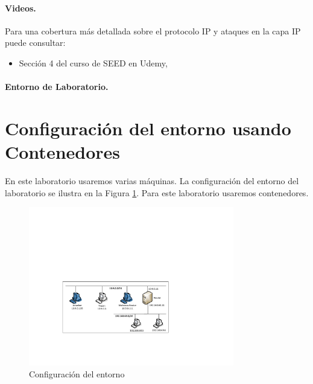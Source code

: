 \paragraph{Videos.}
Para una cobertura más detallada sobre el protocolo IP y ataques en la capa IP puede consultar:

\begin{itemize}
\item Sección 4 del curso de SEED en Udemy, \seedisvideo
\end{itemize}


\paragraph{Entorno de Laboratorio.} \seedenvironmentC



\section{Configuración del entorno usando Contenedores}

En este laboratorio usaremos varias máquinas. La configuración del entorno del laboratorio se ilustra en la Figura \ref{ip:fig:labsetup}.
Para este laboratorio usaremos contenedores.

\begin{figure}[htb]
\begin{center}
\includegraphics[width=0.8\textwidth]{./Figs/TwoLANs_ICMP.pdf}
\end{center}
\caption{Configuración del entorno}
\label{ip:fig:labsetup}
\end{figure}



